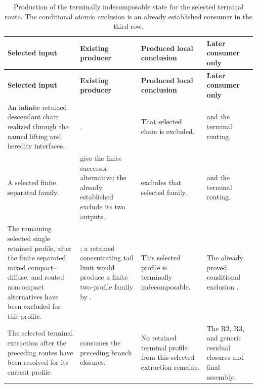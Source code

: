 \documentclass[11pt]{amsart}
\numberwithin{equation}{section}
\theoremstyle{plain}
\theoremstyle{definition}
\theoremstyle{remark}
\begin{document}
\begingroup
\scriptsize
\setlength{\tabcolsep}{2pt}
\renewcommand{\arraystretch}{1.18}
\begin{longtable}{@{}L{0.21\textwidth}L{0.31\textwidth}L{0.23\textwidth}L{0.17\textwidth}@{}}
\caption{Production of the terminally indecomposable state for the selected
terminal route.  The conditional atomic exclusion is an already established
consumer in the third row.}
\label{tab:terminal-indecomposable-production}\\
\hline
\textbf{Selected input} & \textbf{Existing producer} &
\textbf{Produced local conclusion} & \textbf{Later consumer only}\\
\hline
\endfirsthead
\hline
\textbf{Selected input} & \textbf{Existing producer} &
\textbf{Produced local conclusion} & \textbf{Later consumer only}\\
\hline
\endhead
\hline
\endfoot
An infinite retained descendant chain realized through the named lifting and
heredity interfaces. &
. &
That selected chain is excluded. &
 and the terminal routing.\\

A selected finite separated family. &
give the finite successor alternative; the already established
 exclude its two
outputs. &
 excludes that selected
family. &
 and the terminal routing.\\

The remaining selected single retained profile, after the finite separated,
mixed compact--diffuse, and routed noncompact alternatives have been excluded
for this profile. &
; a retained concentrating tail limit
would produce a finite two-profile family by
. &
This selected profile is terminally indecomposable. &
The already proved conditional exclusion .\\

The selected terminal extraction after the preceding routes have been
resolved for its current profile. &
 consumes the preceding branch closures. &
No retained terminal profile from this selected extraction remains. &
The R2, R3, and generic residual closures and final assembly.\\
\hline
\end{longtable}
\endgroup
\end{document}
